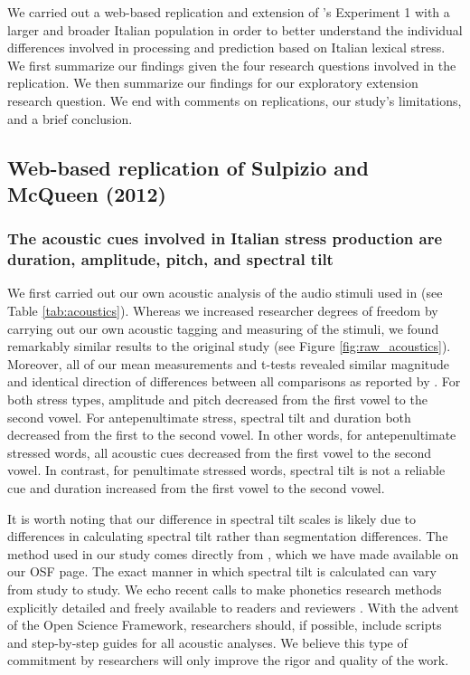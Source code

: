 We carried out a web-based replication and extension of \cite{Sulpizio_McQueen_2012}'s Experiment 1 with a larger and broader Italian population in order to better understand the individual differences involved in processing and prediction based on Italian lexical stress. We first summarize our findings given the four research questions involved in the replication. We then summarize our findings for our exploratory extension research question. We end with comments on replications, our study's limitations, and a brief conclusion.

\subsection{Web-based replication of Sulpizio and McQueen (2012)}
\subsubsection{The acoustic cues involved in Italian stress production are duration, amplitude, pitch, and spectral tilt}
We first carried out our own acoustic analysis of the audio stimuli used in \cite{Sulpizio_McQueen_2012} (see Table \ref{tab:acoustics}). Whereas we increased researcher degrees of freedom \citep{Corretta2023, roettger2019researcher} by carrying out our own acoustic tagging and measuring of the stimuli, we found remarkably similar results to the original study (see Figure \ref{fig:raw_acoustics}). Moreover, all of our mean measurements and t-tests revealed similar magnitude and identical direction of differences between all comparisons as reported by \cite{Sulpizio_McQueen_2012}. For both stress types, amplitude and pitch decreased from the first vowel to the second vowel. For antepenultimate stress, spectral tilt and duration both decreased from the first to the second vowel. In other words, for antepenultimate stressed words, all acoustic cues decreased from the first vowel to the second vowel. In contrast, for penultimate stressed words, spectral tilt is not a reliable cue and duration increased from the first vowel to the second vowel.

It is worth noting that our difference in spectral tilt scales is likely due to differences in calculating spectral tilt rather than segmentation differences. The method used in our study comes directly from \cite{sluijter1996spectral,cutler2007dutch}, which we have made available on our OSF page. The exact manner in which spectral tilt is calculated can vary from study to study. We echo recent calls to make phonetics research methods explicitly detailed and freely available to readers and reviewers \citep{roettger2019emergent, roettger2019researcher}. With the advent of the Open Science Framework, researchers should, if possible, include scripts and step-by-step guides for all acoustic analyses. We believe this type of commitment by researchers will only improve the rigor and quality of the work.


